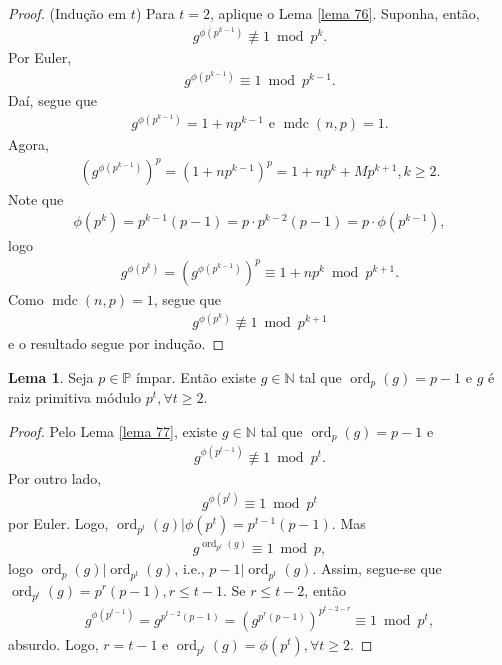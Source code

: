 \documentclass[a4paper,11pt,twoside, leqno]{article}
\DeclareMathOperator{\mdc}{mdc}
\DeclareMathOperator{\Ord}{ord}
\theoremstyle{definition}
\newtheorem{lemma}[theorem]{Lema}
\begin{document}
\begin{proof}
	(Indução em $t$) Para $t=2$, aplique o Lema \eqref{lema 76}. Suponha, então,
	\begin{align*}
	g^{\phi(p^{k-1})}\not\equiv 1\bmod p^k.
	\end{align*}
	Por Euler, 
	\begin{align*}
	g^{\phi(p^{k-1})}\equiv 1\bmod p^{k-1}.
	\end{align*}
	Daí, segue que 
	\begin{align*}
	g^{\phi(p^{k-1})} = 1 + np^{k-1} \text{ e } \mdc(n,p) = 1.
	\end{align*}
	Agora,
	\begin{align*}
	\left( g^{\phi(p^{k-1})} \right)^p = (1 + np^{k-1})^p = 1 + np^k + Mp^{k+1}, k\geq 2.
	\end{align*}
	Note que
	\begin{align*}
	\phi(p^k) = p^{k-1}(p-1) = p\cdot p^{k-2}(p-1) = p\cdot\phi(p^{k-1}),
	\end{align*}
	logo 
	\begin{align*}
	g^{\phi(p^k)} = \left( g^{\phi(p^{k-1})} \right)^p \equiv 1 + np^k\bmod p^{k+1}.
	\end{align*}
	Como $\mdc(n,p) = 1$, segue que
	\begin{align*}
	g^{\phi(p^k)}\not\equiv 1\bmod p^{k+1}
	\end{align*}
	e o resultado segue por indução.
\end{proof}
\begin{lemma}
	\label{lema 78}
	Seja $p\in\mathbb{P}$ ímpar. Então existe $g\in\mathbb{N}$ tal que $\Ord_p(g) = p-1$ e $g$ é raiz primitiva módulo $p^t, \forall t\geq 2$.
\end{lemma}
\begin{proof}
	Pelo Lema \eqref{lema 77}, existe $g\in\mathbb{N}$ tal que $\Ord_p(g) = p-1$ e 
	\begin{align*}
	g^{\phi(p^{t-1})}\not\equiv 1\bmod p^t.
	\end{align*}
	Por outro lado, 
	\begin{align*}
	g^{\phi(p^t)}\equiv 1\bmod p^t
	\end{align*}
	por Euler. Logo, $\Ord_{p^t}(g)|\phi(p^t) = p^{t-1}(p-1)$. Mas
	\begin{align*}
	g^{\Ord_{p^t}(g)}\equiv 1\bmod p,
	\end{align*}
	logo $\Ord_p(g)|\Ord_{p^t}(g)$, i.e., $p-1|\Ord_{p^t}(g)$. Assim, segue-se que $\Ord_{p^t}(g) = p^r(p-1), r\leq t-1$. Se $r\leq t-2$, então
	\begin{align*}
	g^{\phi(p^{t-1})} = g^{p^{t-2}(p-1)} = \left( g^{p^r(p-1)} \right)^{p^{t-2-r}}\equiv 1\bmod p^t,
 	\end{align*}
 	absurdo. Logo, $r = t-1$ e $\Ord_{p^t}(g) = \phi(p^t), \forall t\geq 2$.
\end{proof}
\end{document}
